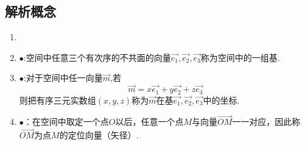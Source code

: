 \subsection{解析概念}
\vspace*{-0.5cm}
\enupdefination[向量解析相关概念]
\begin{enumerate}[]
	\setlength{\itemindent}{3em}
	\setlength{\topsep}{0.01em}
	\setlength{\itemsep}{0.01em}
	\item 
	\item $\bullet$:空间中任意三个有次序的不共面的向量$\overrightarrow{e_1},\overrightarrow{e_2},\overrightarrow{e_3}$称为空间中的一组基.
	\item $\bullet$:对于空间中任一向量$\overrightarrow m$,若
	\begin{equation}
		\overrightarrow{m}=x\overrightarrow{e_1}+y\overrightarrow{e_2}+z\overrightarrow{e_3}
	\end{equation}
	则把有序三元实数组$(x,y,z)$称为$\overrightarrow{m}$在基$\overrightarrow{e_1},\overrightarrow{e_2},\overrightarrow{e_3}$中的坐标.
	\item $\bullet$：在空间中取定一个点$O$以后，任意一个点$M$与向量$\overrightarrow{OM}$一一对应，因此称$\overrightarrow{OM}$为点$M$的定位向量（矢径）. 
\end{enumerate}

	\begin{figure}[h]
		\sj 
{}
\end{figure}

